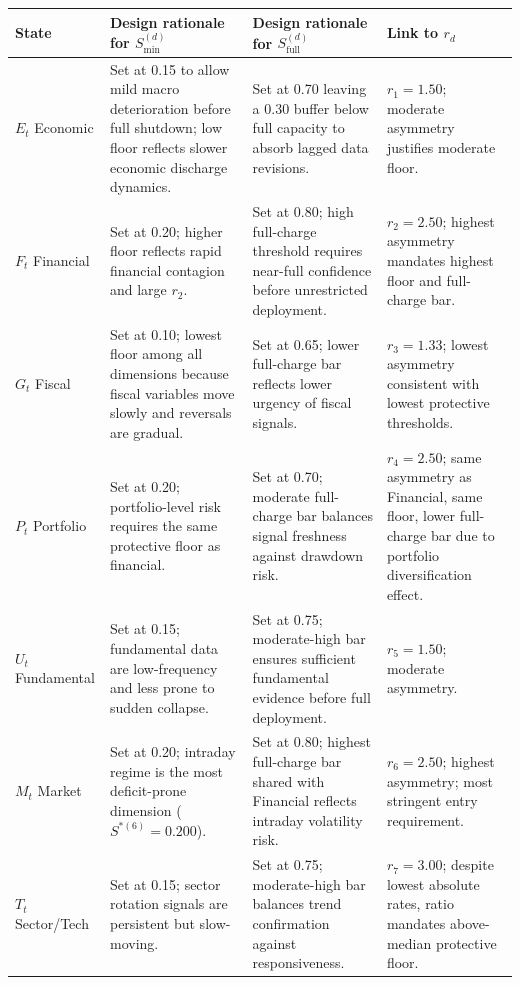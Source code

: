 \documentclass[12pt,openany]{book}
\newcommand{\calE}{\mathcal{E}}
\newcommand{\calF}{\mathcal{F}}
\newcommand{\calG}{\mathcal{G}}
\newcommand{\calP}{\mathcal{P}}
\newcommand{\calU}{\mathcal{U}}
\newcommand{\calM}{\mathcal{M}}
\newcommand{\calT}{\mathcal{T}}
\numberwithin{equation}{chapter}
\theoremstyle{plain}
\theoremstyle{definition}
\theoremstyle{remark}
\def\mathcal#1{#1}%
\begin{document}
\begin{center}
\begin{tabularx}{\textwidth}{@{} l X X X @{}}
\toprule
\textbf{State} & \textbf{Design rationale for}
  $\mathcal{S}_{\min}^{(d)}$
  & \textbf{Design rationale for}
  $\mathcal{S}_{\mathrm{full}}^{(d)}$
  & \textbf{Link to $r_d$} \\
\midrule
$\calE_t$ Economic
  & Set at 0.15 to allow mild macro deterioration
    before full shutdown; low floor reflects slower
    economic discharge dynamics.
  & Set at 0.70 leaving a 0.30 buffer below full
    capacity to absorb lagged data revisions.
  & $r_1 = 1.50$; moderate asymmetry justifies
    moderate floor. \\[4pt]
$\calF_t$ Financial
  & Set at 0.20; higher floor reflects rapid
    financial contagion and large $r_2$.
  & Set at 0.80; high full-charge threshold
    requires near-full confidence before
    unrestricted deployment.
  & $r_2 = 2.50$; highest asymmetry mandates
    highest floor and full-charge bar. \\[4pt]
$\calG_t$ Fiscal
  & Set at 0.10; lowest floor among all
    dimensions because fiscal variables
    move slowly and reversals are gradual.
  & Set at 0.65; lower full-charge bar
    reflects lower urgency of fiscal signals.
  & $r_3 = 1.33$; lowest asymmetry consistent
    with lowest protective thresholds. \\[4pt]
$\calP_t$ Portfolio
  & Set at 0.20; portfolio-level risk requires
    the same protective floor as financial.
  & Set at 0.70; moderate full-charge bar
    balances signal freshness against
    drawdown risk.
  & $r_4 = 2.50$; same asymmetry as Financial,
    same floor, lower full-charge bar due
    to portfolio diversification effect. \\[4pt]
$\calU_t$ Fundamental
  & Set at 0.15; fundamental data are
    low-frequency and less prone to
    sudden collapse.
  & Set at 0.75; moderate-high bar ensures
    sufficient fundamental evidence before
    full deployment.
  & $r_5 = 1.50$; moderate asymmetry. \\[4pt]
$\calM_t$ Market
  & Set at 0.20; intraday regime is the
    most deficit-prone dimension
    ($\mathcal{S}^{*(6)} = 0.200$).
  & Set at 0.80; highest full-charge bar
    shared with Financial reflects
    intraday volatility risk.
  & $r_6 = 2.50$; highest asymmetry; most
    stringent entry requirement. \\[4pt]
$\calT_t$ Sector/Tech
  & Set at 0.15; sector rotation signals
    are persistent but slow-moving.
  & Set at 0.75; moderate-high bar balances
    trend confirmation against
    responsiveness.
  & $r_7 = 3.00$; despite lowest absolute
    rates, ratio mandates above-median
    protective floor. \\
\bottomrule
\end{tabularx}
\end{center}
\end{document}
